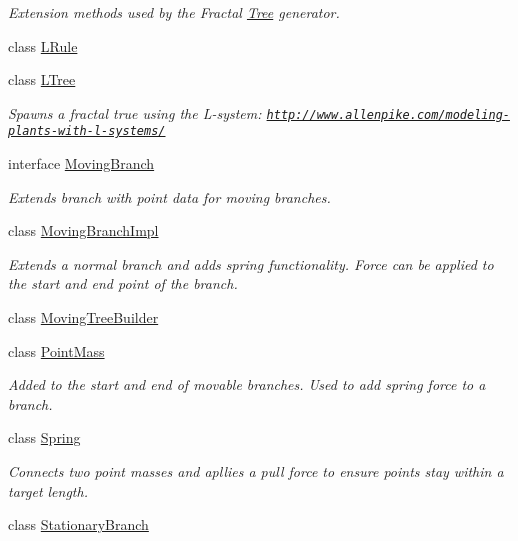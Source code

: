 \begin{DoxyCompactItemize}
\begin{DoxyCompactList}\small\item\em Extension methods used by the Fractal \hyperlink{interface_fractal_tree_1_1_tree}{Tree} generator. \end{DoxyCompactList}\item 
class \hyperlink{class_fractal_tree_1_1_l_rule}{L\+Rule}
\item 
class \hyperlink{class_fractal_tree_1_1_l_tree}{L\+Tree}
\begin{DoxyCompactList}\small\item\em Spawns a fractal true using the L-\/system\+: \href{http://www.allenpike.com/modeling-plants-with-l-systems/}{\tt http\+://www.\+allenpike.\+com/modeling-\/plants-\/with-\/l-\/systems/} \end{DoxyCompactList}\item 
interface \hyperlink{interface_fractal_tree_1_1_moving_branch}{Moving\+Branch}
\begin{DoxyCompactList}\small\item\em Extends branch with point data for moving branches. \end{DoxyCompactList}\item 
class \hyperlink{class_fractal_tree_1_1_moving_branch_impl}{Moving\+Branch\+Impl}
\begin{DoxyCompactList}\small\item\em Extends a normal branch and adds spring functionality. Force can be applied to the start and end point of the branch. \end{DoxyCompactList}\item 
class \hyperlink{class_fractal_tree_1_1_moving_tree_builder}{Moving\+Tree\+Builder}
\item 
class \hyperlink{class_fractal_tree_1_1_point_mass}{Point\+Mass}
\begin{DoxyCompactList}\small\item\em Added to the start and end of movable branches. Used to add spring force to a branch. \end{DoxyCompactList}\item 
class \hyperlink{class_fractal_tree_1_1_spring}{Spring}
\begin{DoxyCompactList}\small\item\em Connects two point masses and apllies a pull force to ensure points stay within a target length. \end{DoxyCompactList}\item 
class \hyperlink{class_fractal_tree_1_1_stationary_branch}{Stationary\+Branch}

\end{DoxyCompactItemize}
